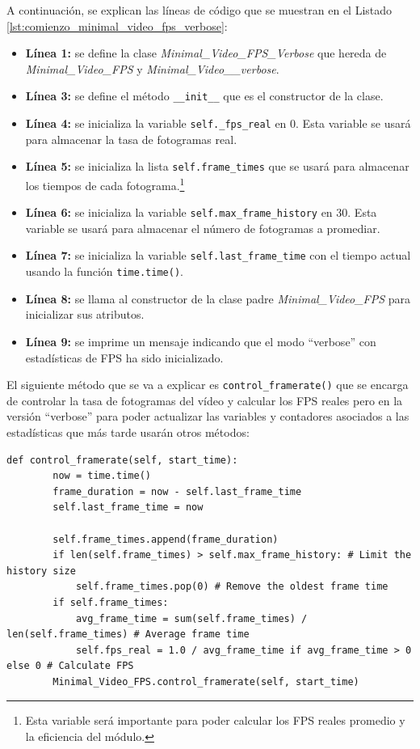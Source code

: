 A continuación, se explican las líneas de código que se muestran en el Listado \ref{lst:comienzo_minimal_video_fps_verbose}:
\begin{itemize}
    \item \textbf{Línea 1:} se define la clase \textit{Minimal\_Video\_FPS\_Verbose} que hereda de \textit{Minimal\_Video\_FPS} y \textit{Minimal\_Video\_\_verbose}.
    \item \textbf{Línea 3:} se define el método \texttt{\_\_init\_\_} que es el constructor de la clase.
    \item \textbf{Línea 4:} se inicializa la variable \texttt{self.\_fps\_real} en 0. Esta variable se usará para almacenar la tasa de fotogramas real.
    \item \textbf{Línea 5:} se inicializa la lista \texttt{self.frame\_times} que se usará para almacenar los tiempos de cada fotograma.\footnote{Esta variable será importante para poder calcular los FPS reales promedio y la eficiencia del módulo.}
    \item \textbf{Línea 6:} se inicializa la variable \texttt{self.max\_frame\_history} en 30. Esta variable se usará para almacenar el número de fotogramas a promediar.
    \item \textbf{Línea 7:} se inicializa la variable \texttt{self.last\_frame\_time} con el tiempo actual usando la función \texttt{time.time()}.
    \item \textbf{Línea 8:} se llama al constructor de la clase padre \textit{Minimal\_Video\_FPS} para inicializar sus atributos.
    \item \textbf{Línea 9:} se imprime un mensaje indicando que el modo ``verbose'' con estadísticas de FPS ha sido inicializado.
\end{itemize}
\vspace{\baselineskip}

El siguiente método que se va a explicar es \texttt{control\_framerate()} que se encarga de controlar la tasa de fotogramas del vídeo y calcular los FPS reales pero en la versión ``verbose'' para poder actualizar las variables y contadores asociados a las estadísticas que más tarde usarán otros métodos:
\begin{lstlisting}[style=pythonstyle, caption={Método \texttt{control\_framerate()} de \textit{Minimal\_Video\_FPS}.}, label={lst:control_framerate_minimal_video_fps_verbose}]
def control_framerate(self, start_time):
        now = time.time()
        frame_duration = now - self.last_frame_time
        self.last_frame_time = now

        self.frame_times.append(frame_duration)
        if len(self.frame_times) > self.max_frame_history: # Limit the history size
            self.frame_times.pop(0) # Remove the oldest frame time
        if self.frame_times:
            avg_frame_time = sum(self.frame_times) / len(self.frame_times) # Average frame time
            self.fps_real = 1.0 / avg_frame_time if avg_frame_time > 0 else 0 # Calculate FPS
        Minimal_Video_FPS.control_framerate(self, start_time)
\end{lstlisting}
\vspace{\baselineskip}

